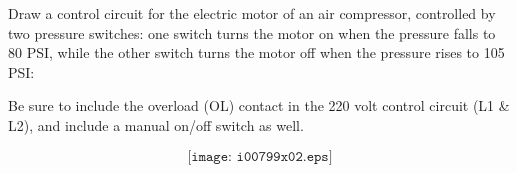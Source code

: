

Draw a control circuit for the electric motor of an air compressor, controlled by two pressure switches: one switch turns the motor on when the pressure falls to 80 PSI, while the other switch turns the motor off when the pressure rises to 105 PSI:


Be sure to include the overload (OL) contact in the 220 volt control circuit (L1 \& L2), and include a manual on/off switch as well.







$$\texttt{[image: i00799x02.eps]}$$











